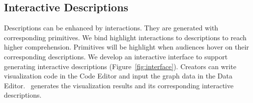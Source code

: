 



\subsection{Interactive Descriptions}
Descriptions can be enhanced by interactions.
They are generated with corresponding primitives.
We bind highlight interactions to descriptions to reach higher comprehension.
Primitives will be highlight when audiences hover on their corresponding descriptions.
We develop an interactive interface to support generating interactive descriptions (Figure~\ref{fig:interface}).
Creators can write visualization code in the Code Editor and input the graph data in the Data Editor.
\ApproachName~generates the visualization results and its corresponding interactive descriptions.


